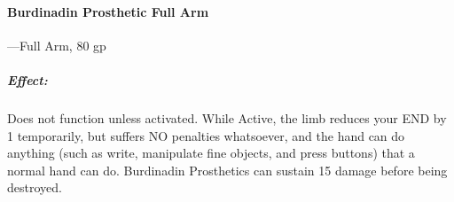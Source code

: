 \documentclass[oneside,11pt,english]{book}
\begin{document}
\paragraph{Burdinadin Prosthetic Full Arm}---\quad Full Arm, 80 gp
\vspace{-15pt} \subparagraph{Effect:} Does not function unless activated. While
Active, the limb reduces your END by 1 temporarily, but suffers NO penalties
whatsoever, and the hand can do anything (such as write, manipulate fine
objects, and press buttons) that a normal hand can do. Burdinadin Prosthetics
can sustain 15 damage before being destroyed. 


\end{document}
